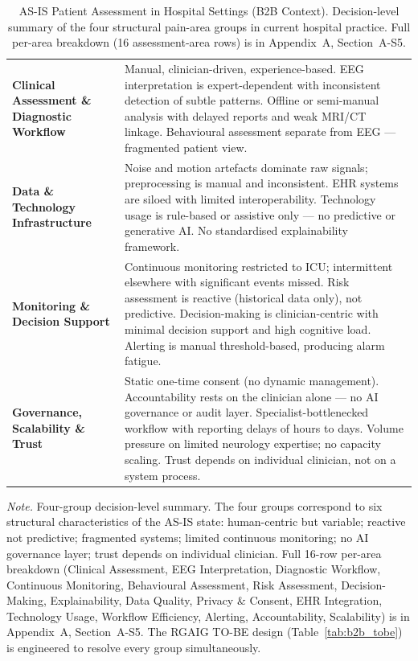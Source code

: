 {\tablestripes\tablefontsize

\begin{xltabular}{\textwidth}{@{} >{\raggedright\arraybackslash}p{3.6cm} L @{}}
\caption[AS-IS Patient Assessment in Hospital Settings (B2B Context)]{AS-IS Patient Assessment in Hospital Settings (B2B Context). Decision-level summary of the four structural pain-area groups in current hospital practice. Full per-area breakdown (16 assessment-area rows) is in Appendix~A, Section~A-S5.}\label{tab:asis_hospital} \\
\toprule
{} &  \\
\midrule
\endfirsthead
\endhead
\bottomrule
\endlastfoot
\textbf{Clinical Assessment \& Diagnostic Workflow} & Manual, clinician-driven, experience-based. EEG interpretation is expert-dependent with inconsistent detection of subtle patterns. Offline or semi-manual analysis with delayed reports and weak MRI/CT linkage. Behavioural assessment separate from EEG --- fragmented patient view. \\
\addlinespace
\textbf{Data \& Technology Infrastructure} & Noise and motion artefacts dominate raw signals; preprocessing is manual and inconsistent. EHR systems are siloed with limited interoperability. Technology usage is rule-based or assistive only --- no predictive or generative AI. No standardised explainability framework. \\
\addlinespace
\textbf{Monitoring \& Decision Support} & Continuous monitoring restricted to ICU; intermittent elsewhere with significant events missed. Risk assessment is reactive (historical data only), not predictive. Decision-making is clinician-centric with minimal decision support and high cognitive load. Alerting is manual threshold-based, producing alarm fatigue. \\
\addlinespace
\textbf{Governance, Scalability \& Trust} & Static one-time consent (no dynamic management). Accountability rests on the clinician alone --- no AI governance or audit layer. Specialist-bottlenecked workflow with reporting delays of hours to days. Volume pressure on limited neurology expertise; no capacity scaling. Trust depends on individual clinician, not on a system process. \\
\end{xltabular}}
\vspace{0.4em}
\noindent\textit{Note.} Four-group decision-level summary. The four groups correspond to six structural characteristics of the AS-IS state: human-centric but variable; reactive not predictive; fragmented systems; limited continuous monitoring; no AI governance layer; trust depends on individual clinician. Full 16-row per-area breakdown (Clinical Assessment, EEG Interpretation, Diagnostic Workflow, Continuous Monitoring, Behavioural Assessment, Risk Assessment, Decision-Making, Explainability, Data Quality, Privacy \& Consent, EHR Integration, Technology Usage, Workflow Efficiency, Alerting, Accountability, Scalability) is in Appendix~A, Section~A-S5. The RGAIG TO-BE design (Table~\ref{tab:b2b_tobe}) is engineered to resolve every group simultaneously.


